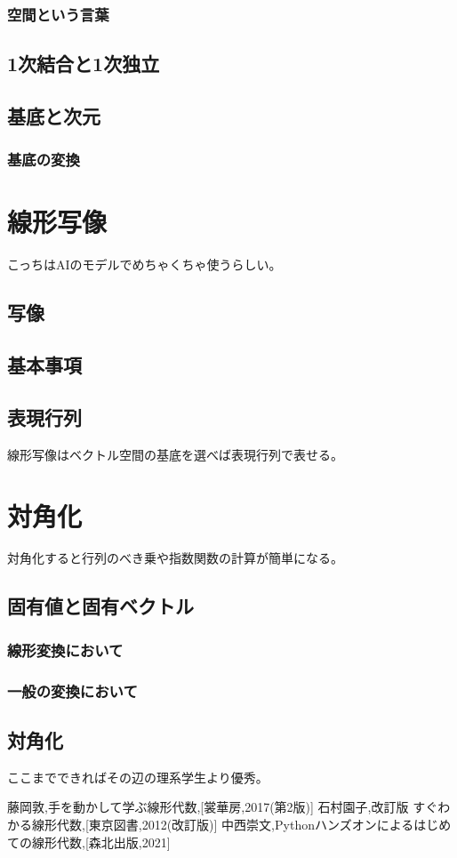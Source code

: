 \documentclass[10pt]{jsarticle}
\theoremstyle{definition}%
\numberwithin{equation}{section}%
\begin{document}
\subsubsection{空間という言葉}
\subsection{1次結合と1次独立}
\subsection{基底と次元}
\subsubsection{基底の変換}
\section{線形写像}
こっちはAIのモデルでめちゃくちゃ使うらしい。
\subsection{写像}
\subsection{基本事項}
\subsection{表現行列}
線形写像はベクトル空間の基底を選べば表現行列で表せる。
\section{対角化}
対角化すると行列のべき乗や指数関数の計算が簡単になる。
\subsection{固有値と固有ベクトル}
\subsubsection{線形変換において}
\subsubsection{一般の変換において}
\subsection{対角化}
ここまでできればその辺の理系学生より優秀。
\begin{thebibliography}{99}
   藤岡敦,手を動かして学ぶ線形代数,[裳華房,2017(第2版)]
   石村園子,改訂版 すぐわかる線形代数,[東京図書,2012(改訂版)]
   中西崇文,Pythonハンズオンによるはじめての線形代数,[森北出版,2021]
\end{thebibliography}
\end{document}
